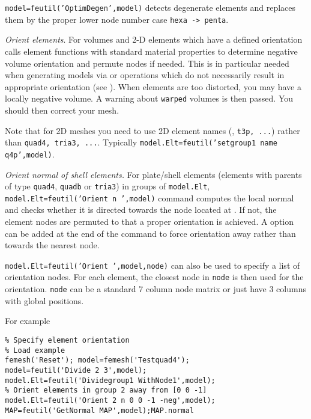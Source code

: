{\tt model=feutil('OptimDegen',model)} detects degenerate elements and replaces them by the proper lower node number case {\tt hexa -> penta}. 



{\sl Orient elements}.  For volumes and 2-D elements which have a defined orientation  calls element functions with standard material properties to determine negative volume orientation and permute nodes if needed. This is in particular needed when generating models via  or  operations which do not necessarily result in appropriate orientation (see \integrules). When elements are too distorted, you may have a locally negative volume. A warning about {\tt warped} volumes is then passed. You should then correct your mesh. 

Note that for 2D meshes you need to use 2D element names (\qfourp, {\tt t3p, ...}) rather than {\tt quad4, tria3, ...}. Typically  {\tt model.Elt=feutil('setgroup1 name q4p',model)}.

{\sl Orient normal of shell elements.} For plate/shell elements (elements with parents of type {\tt quad4}, {\tt quadb} or {\tt tria3}) in groups  of {\tt model.Elt},  {\tt model.Elt=feutil('Orient  n ',model)} command computes the local normal and checks whether it is directed towards the node located at . If not, the element nodes are permuted to that a proper orientation is achieved. A  option can be added at the end of the command to force orientation away rather than towards the nearest node.

{\tt model.Elt=feutil('Orient ',model,node)} can also be used to specify a list of orientation nodes. For each element, the closest node in {\tt node}  is then used for the orientation. {\tt node} can be a standard 7 column node matrix or just have 3 columns with global positions.

For example

\begin{verbatim}
% Specify element orientation
% Load example
femesh('Reset'); model=femesh('Testquad4'); 
model=feutil('Divide 2 3',model);
model.Elt=feutil('Dividegroup1 WithNode1',model); 
% Orient elements in group 2 away from [0 0 -1]
model.Elt=feutil('Orient 2 n 0 0 -1 -neg',model);
MAP=feutil('GetNormal MAP',model);MAP.normal
\end{verbatim}%

